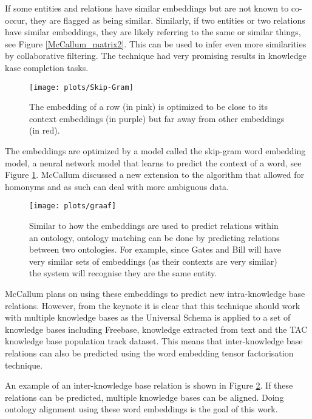 \documentclass{article}
\begin{document}
 If some entities and relations have similar embeddings but are not known to co-occur, they are flagged as being similar. Similarly, if two entities or two relations have similar embeddings, they are likely referring to the same or similar things, see Figure \ref{McCallum_matrix2}. This can be used to infer even more similarities by collaborative filtering. The technique had very promising results in knowledge kase completion tasks.
  
 \begin{figure}[H]
 \centering
 \texttt{[image: plots/Skip-Gram]}
 \caption[Skip-Gram model]{The embedding of a row (in pink) is optimized to be close to its context embeddings (in purple) but far away from other embeddings (in red).}
 \label{Skip-Gram-img}
 \end{figure}
 
 The embeddings are optimized by a model called the skip-gram word embedding model\cite{w2v}, a neural network model that learns to predict the context of a word, see Figure \ref{Skip-Gram-img}. McCallum discussed a new extension to the algorithm that allowed for homonyms and as such can deal with more ambiguous data\cite{mccallumweblecture}.
  
 \begin{figure}[H]
 \centering
 \texttt{[image: plots/graaf]}
 \caption[Ontology matching graph example]{Similar to how the embeddings are used to predict relations within an ontology, ontology matching can be done by predicting relations between two ontologies. For example, since Gates and Bill will have very similar sets of embeddings (as their contexts are very similar) the system will recognise they are the same entity.}
 \label{merge_graph}
 \end{figure}
 
 McCallum plans on using these embeddings to predict new intra-knowledge base relations. However, from the keynote it is clear that this technique should work with multiple knowledge bases as the Universal Schema is applied to a set of knowledge bases including Freebase, knowledge extracted from text and the TAC knowledge base population track dataset. This means that inter-knowledge base relations can also be predicted using the word embedding tensor factorisation technique.
 
 An example of an inter-knowledge base relation is shown in Figure \ref{merge_graph}. If these relations can be predicted, multiple knowledge bases can be aligned. Doing ontology alignment using these word embeddings is the goal of this work.
\end{document}
